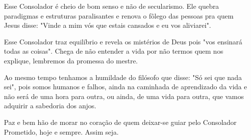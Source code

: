 \emdash{}Esse Consolador é cheio de bom senso e não de secularismo. Ele quebra paradigmas e estruturas paralisantes e renova o fôlego das pessoas pra quem Jesus disse: "Vinde a mim vós que estais cansados e eu vos aliviarei".

\emdash{}Esse Consolador traz equilíbrio e revela os mistérios de Deus pois "vos ensinará todas as coisas". Chega de não entender a vida por não termos quem nos explique, lembremos da promessa do mestre.


\emdash{}Ao mesmo tempo tenhamos a humildade do filósofo que disse: "Só sei que nada sei", pois somos humanos e falhos, ainda na caminhada de aprendizado da vida e não será de uma hora para outra, ou ainda, de uma vida para outra, que vamos adquirir a sabedoria dos anjos.

\emdash{}Paz e bem hão de morar no coração de quem deixar-se guiar pelo Consolador Prometido, hoje e sempre. Assim seja.